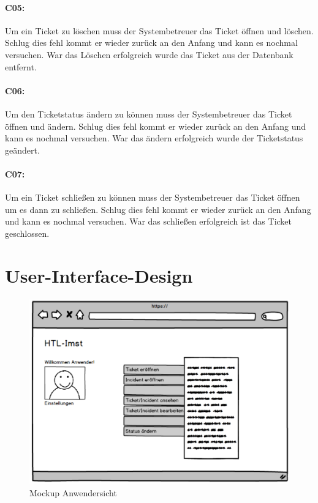 \paragraph{C05:}
Um ein Ticket zu löschen muss der Systembetreuer das Ticket öffnen und löschen. Schlug dies fehl kommt er wieder zurück an den Anfang und kann es nochmal versuchen. War das Löschen erfolgreich wurde das Ticket aus der Datenbank entfernt.
\paragraph{C06:}
Um den Ticketstatus ändern zu können muss der Systembetreuer das Ticket öffnen und ändern. Schlug dies fehl kommt er wieder zurück an den Anfang und kann es nochmal versuchen. War das ändern erfolgreich wurde der Ticketstatus geändert.
\paragraph{C07:}
Um ein Ticket schließen zu können muss der Systembetreuer das Ticket öffnen um es dann zu schließen. Schlug dies fehl kommt er wieder zurück an den Anfang und kann es nochmal versuchen. War das schließen erfolgreich ist das Ticket geschlossen.

\newpage
\section{User-Interface-Design}	
\begin{figure}[h]
	\centering
	\includegraphics[scale=0.44]{figures/Wireframe_Anwender.png}
	\caption{Mockup Anwendersicht}
	\label{Abb_Mockup_Anwendersicht}
\end{figure}

